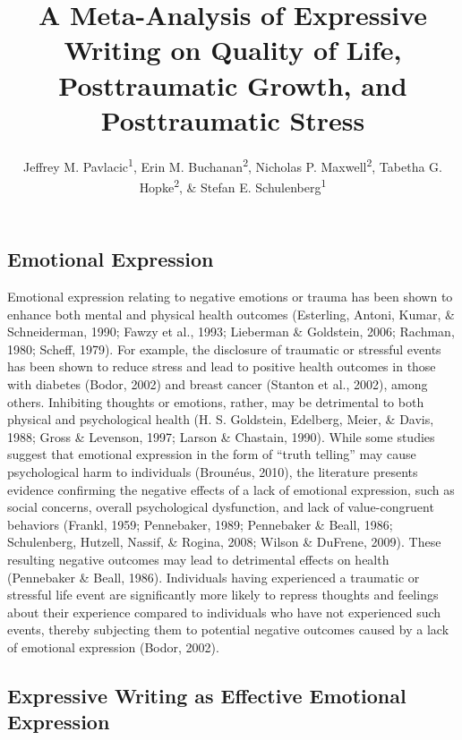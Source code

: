 \documentclass[man, mask]{apa6}
\title{A Meta-Analysis of Expressive Writing on Quality of Life, Posttraumatic
Growth, and Posttraumatic Stress}
\author{Jeffrey M. Pavlacic\textsuperscript{1}, Erin M. Buchanan\textsuperscript{2}, Nicholas P. Maxwell\textsuperscript{2}, Tabetha G. Hopke\textsuperscript{2}, \& Stefan E. Schulenberg\textsuperscript{1}}
\affiliation{
    \vspace{0.5cm}
          \textsuperscript{1} University of Mississippi\\
          \textsuperscript{2} Missouri State University  }
\theoremstyle{definition}
\theoremstyle{definition}
\theoremstyle{definition}
\theoremstyle{remark}
\begin{document}
\maketitle

\setcounter{secnumdepth}{0}



\subsection{Emotional Expression}\label{emotional-expression}

Emotional expression relating to negative emotions or trauma has been
shown to enhance both mental and physical health outcomes (Esterling,
Antoni, Kumar, \& Schneiderman, 1990; Fawzy et al., 1993; Lieberman \&
Goldstein, 2006; Rachman, 1980; Scheff, 1979). For example, the
disclosure of traumatic or stressful events has been shown to reduce
stress and lead to positive health outcomes in those with diabetes
(Bodor, 2002) and breast cancer (Stanton et al., 2002), among others.
Inhibiting thoughts or emotions, rather, may be detrimental to both
physical and psychological health (H. S. Goldstein, Edelberg, Meier, \&
Davis, 1988; Gross \& Levenson, 1997; Larson \& Chastain, 1990). While
some studies suggest that emotional expression in the form of
\enquote{truth telling} may cause psychological harm to individuals
(Brounéus, 2010), the literature presents evidence confirming the
negative effects of a lack of emotional expression, such as social
concerns, overall psychological dysfunction, and lack of value-congruent
behaviors (Frankl, 1959; Pennebaker, 1989; Pennebaker \& Beall, 1986;
Schulenberg, Hutzell, Nassif, \& Rogina, 2008; Wilson \& DuFrene, 2009).
These resulting negative outcomes may lead to detrimental effects on
health (Pennebaker \& Beall, 1986). Individuals having experienced a
traumatic or stressful life event are significantly more likely to
repress thoughts and feelings about their experience compared to
individuals who have not experienced such events, thereby subjecting
them to potential negative outcomes caused by a lack of emotional
expression (Bodor, 2002).

\subsection{Expressive Writing as Effective Emotional
Expression}\label{expressive-writing-as-effective-emotional-expression}
\end{document}
